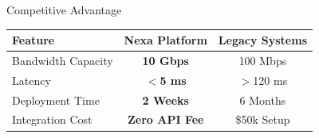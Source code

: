 \documentclass[aspectratio=169, xcolor={table}]{beamer}
\begin{document}
\begin{frame}{Competitive Advantage}
    \begin{table}[h]
    \centering
    \renewcommand{\arraystretch}{1.3}
    \begin{tabularx}{\textwidth}{L C C}
    \toprule
    \textbf{Feature} & \textbf{Nexa Platform} & \textbf{Legacy Systems} \\
    \midrule
    Bandwidth Capacity & \textbf{10 Gbps} & 100 Mbps \\
    Latency & \textbf{$<$5 ms} & $>$120 ms \\
    Deployment Time & \textbf{2 Weeks} & 6 Months \\
    Integration Cost & \textbf{Zero API Fee} & \$50k Setup \\
    \bottomrule
    \end{tabularx}
    \end{table}
\end{frame}
\end{document}
